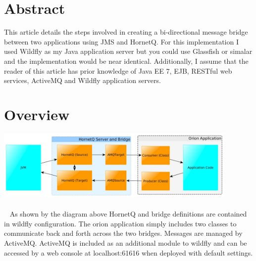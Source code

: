 \documentclass[
10pt, %
letterpaper, %
oneside, %
headinclude,footinclude, %
BCOR5mm, %
]{scrartcl}
\title{\normalfont\spacedallcaps{Bi-Directional JMS Bridge}} %
\author{\spacedlowsmallcaps{Michael Meding* , mmeding@outsmartinc.com}} %
\date{} %
\begin{document}
\maketitle %

\setcounter{tocdepth}{2} %

\tableofcontents %

\thispagestyle{empty} %

 
\section*{Abstract}
This article details the steps involved in creating a bi-directional message bridge between two applications using JMS and HornetQ. For this implementation I used Wildfly as my Java application server but you could use Glassfish or simalar and the implementation would be near identical. Additionally, I assume that the reader of this article has prior knowledge of Java EE 7, EJB, RESTful web services, ActiveMQ and Wildfly application servers.



\section{Overview}


\includegraphics[width=11.75cm]{FlowchartPic} %
\paragraph{}~\newline
As shown by the diagram above HornetQ and bridge definitions are contained in wildfly configuration. The orion application simply includes two classes to communicate back and forth across the two bridges. Messages are managed by ActiveMQ. ActiveMQ is included as an additional module to wildfly and can be accessed by a web console at localhost:61616 when deployed with default settings.
\end{document}
